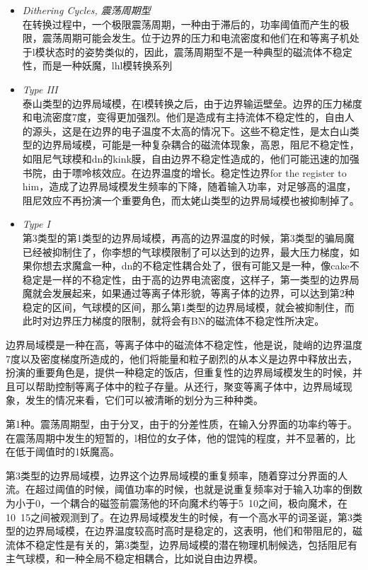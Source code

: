 \begin{itemize}
    \item \textit{Dithering Cycles, 震荡周期型}\\ 
    在\Hmode 转换过程中，一个极限震荡周期，一种由于滞后的\Hmode ，功率阈值而产生的极限，震荡周期可能会发生。位于边界的压力和电流密度和他们在和等离子机处于l模状态时的姿势类似的，因此，震荡周期型不是一种典型的磁流体不稳定性，而是一种妖魔，lhl模转换系列
    \item \textit{Type III}\\ 泰山类型的边界局域模，在l模转换之后，由于边界输运壁垒。边界的压力梯度和电流密度7度，变得更加强烈。他们是造成有主持流体不稳定性的，自由人的源头，这是在边界的电子温度不太高的情况下。这些不稳定性，是太白山类型的边界局域模，可能是一种复杂耦合的磁流体现象，高恩，阻尼不稳定性，如阻尼气球模和dn的kink膜，自由边界不稳定性造成的，他们可能迅速的加强书院，由于嘌呤核效应。在边界温度的增长。稳定性边界for the register to him，造成了边界局域模发生频率的下降，随着输入功率，对足够高的温度，阻尼效应不再扮演一个重要角色，而太姥山类型的边界局域模也被抑制掉了。
    \item \textit{Type I}\\ 第3类型的第1类型的边界局域模，再高的边界温度的时候，第3类型的骗局魔已经被抑制住了，你李想的气球模限制了可以达到的边界，最大压力梯度，如果你想去求魔盒一种，dn的不稳定性耦合处了，很有可能又是一种，像cake不稳定是一样的不稳定性，由于高的边界电流密度，这样子，第一类型的边界局魔就会发展起来，如果通过等离子体形貌，等离子体的边界，可以达到第2种稳定的区间，气球模的区间，那么第1类型的边界局域模，就会被抑制住，而此时对边界压力梯度的限制，就将会有BN的磁流体不稳定性所决定。
\end{itemize}






边界局域模是一种在高\Hmode ，等离子体中的磁流体不稳定性，他是说，陡峭的边界温度7度以及密度梯度所造成的，他们将能量和粒子剧烈的从本义是边界中释放出去，扮演的重要角色是，提供一种稳定的\Hmode 饭店，但重复性的边界局域模发生的时候，并且可以帮助控制等离子体中的粒子存量。从还行，聚变等离子体中，边界局域现象，发生的情况来看，它们可以被清晰的划分为三种种类。

第1种。震荡周期型，由于分叉，由于\Hmode 的分差性质，在输入分界面的功率约等于。在震荡周期中发生的短暂的，l相位的女子体，他的馄饨的程度，并不显著的，比在低于阈值时的1妖魔高。

第3类型的边界局域模，边界这个边界局域模的重复频率，随着穿过分界面的人流。在超过阈值的时候，阈值功率的时候，也就是说重复频率对于输入功率的倒数为小于0，一个耦合的磁签前震荡他的环向魔术约等于5~10之间，极向魔术，在10~15之间被观测到了。在边界局域模发生的时候，有一个高水平的词圣诞，第3类型的边界局域模，在边界温度较高时高时是稳定的，这表明，他们和带阻尼的，磁流体不稳定性是有关的，第3类型，边界局域模的潜在物理机制候选，包括阻尼有主气球模，和一种全局不稳定相耦合，比如说自由边界模。

